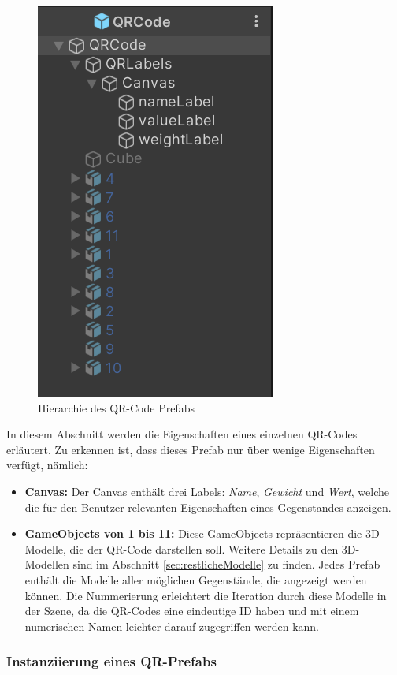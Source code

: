 \begin{figure}[H]
    \centering
    \includegraphics[scale=0.6, angle=0]{images/qrprefab}
    \caption{Hierarchie des QR-Code Prefabs}
    \label{fig:qrprefab}
\end{figure}


In diesem Abschnitt werden die Eigenschaften eines einzelnen QR-Codes erläutert. Zu erkennen ist, dass dieses Prefab nur über wenige Eigenschaften verfügt, nämlich:
\begin{itemize}
    \item \textbf{Canvas:} Der Canvas enthält drei Labels: \textit{Name}, \textit{Gewicht} und \textit{Wert}, welche die für den Benutzer relevanten Eigenschaften eines Gegenstandes anzeigen.
    \item \textbf{GameObjects von 1 bis 11:} Diese GameObjects repräsentieren die 3D-Modelle, die der QR-Code darstellen soll. Weitere Details zu den 3D-Modellen sind im Abschnitt \ref{sec:restlicheModelle} zu finden. Jedes Prefab enthält die Modelle aller möglichen Gegenstände, die angezeigt werden können. Die Nummerierung erleichtert die Iteration durch diese Modelle in der Szene, da die QR-Codes eine eindeutige ID haben und mit einem numerischen Namen leichter darauf zugegriffen werden kann.
\end{itemize}

\subsubsection*{Instanziierung eines QR-Prefabs}

